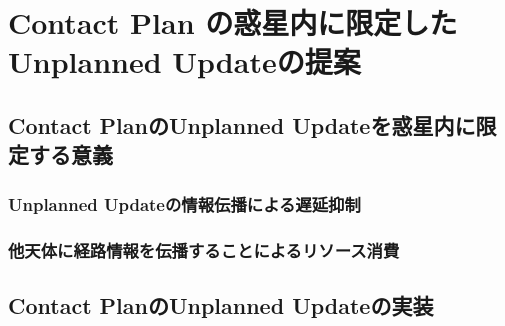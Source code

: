\chapter{Contact Plan の惑星内に限定した Unplanned Updateの提案}
\label{chap:design_and_impl}
\section{Contact PlanのUnplanned Updateを惑星内に限定する意義}
\subsection{Unplanned Updateの情報伝播による遅延抑制}

\subsection{他天体に経路情報を伝播することによるリソース消費}
\section{Contact PlanのUnplanned Updateの実装}